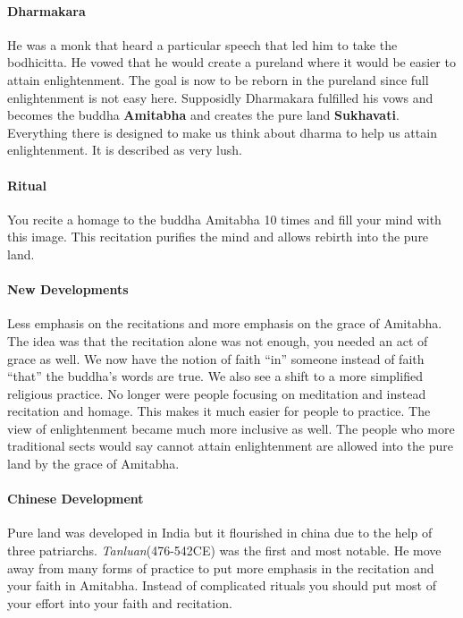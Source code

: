 \documentclass{article}
\begin{document}
\paragraph{Dharmakara}
\label{par:dharmakara}
He was a monk that heard a particular speech that led him to take the bodhicitta. He vowed that he would create a pureland where it would be easier to attain enlightenment. The goal is now to be reborn in the pureland since full enlightenment is not easy here. Supposidly Dharmakara fulfilled his vows and becomes the buddha \textbf{Amitabha} and creates the pure land \textbf{Sukhavati}. Everything there is designed to make us think about dharma to help us attain enlightenment. It is described as very lush.

\paragraph{Ritual}
\label{par:ritual}
You recite a homage to the buddha Amitabha 10 times and fill your mind with this image. This recitation purifies the mind and allows rebirth into the pure land.

\paragraph{New Developments}
\label{par:new_developments}
Less emphasis on the recitations and more emphasis on the grace of Amitabha. The idea was that the recitation alone was not enough, you needed an act of grace as well. We now have the notion of faith ``in'' someone instead of faith ``that'' the buddha's words are true. We also see a shift to a more simplified religious practice. No longer were people focusing on meditation and instead recitation and homage. This makes it much easier for people to practice. The view of enlightenment became much more inclusive as well. The people who more traditional sects would say cannot attain enlightenment are allowed into the pure land by the grace of Amitabha.

\paragraph{Chinese Development}
\label{par:chinese_development}
Pure land was developed in India but it flourished in china due to the help of three patriarchs. \emph{Tanluan}(476-542CE) was the first and most notable. He move away from many forms of practice to put more emphasis in the recitation and your faith in Amitabha. Instead of complicated rituals you should put most of your effort into your faith and recitation.
\end{document}
